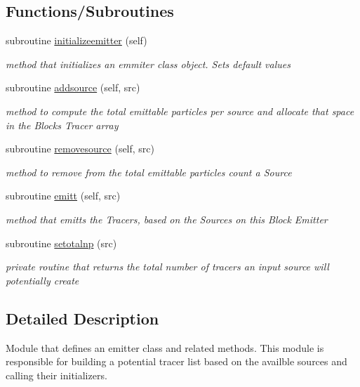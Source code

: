 \subsection*{Functions/\+Subroutines}
\begin{DoxyCompactItemize}
\item 
subroutine \mbox{\hyperlink{namespaceemitter__mod_a6376ad0f8e1739b29caf672aa0750373}{initializeemitter}} (self)
\begin{DoxyCompactList}\small\item\em method that initializes an emmiter class object. Sets default values \end{DoxyCompactList}\item 
subroutine \mbox{\hyperlink{namespaceemitter__mod_ab704fb0e2eb9b3b4b9542706b6fb4eaf}{addsource}} (self, src)
\begin{DoxyCompactList}\small\item\em method to compute the total emittable particles per source and allocate that space in the Blocks Tracer array \end{DoxyCompactList}\item 
subroutine \mbox{\hyperlink{namespaceemitter__mod_a49b704640270da1c4fad50fcd5374376}{removesource}} (self, src)
\begin{DoxyCompactList}\small\item\em method to remove from the total emittable particles count a Source \end{DoxyCompactList}\item 
subroutine \mbox{\hyperlink{namespaceemitter__mod_aae156a463b225044bc10f039ede5770d}{emitt}} (self, src)
\begin{DoxyCompactList}\small\item\em method that emitts the Tracers, based on the Sources on this Block Emitter \end{DoxyCompactList}\item 
subroutine \mbox{\hyperlink{namespaceemitter__mod_a5c219dd6692a761ad4bf968ae750fcc6}{setotalnp}} (src)
\begin{DoxyCompactList}\small\item\em private routine that returns the total number of tracers an input source will potentially create \end{DoxyCompactList}\end{DoxyCompactItemize}


\subsection{Detailed Description}
Module that defines an emitter class and related methods. This module is responsible for building a potential tracer list based on the availble sources and calling their initializers. 

